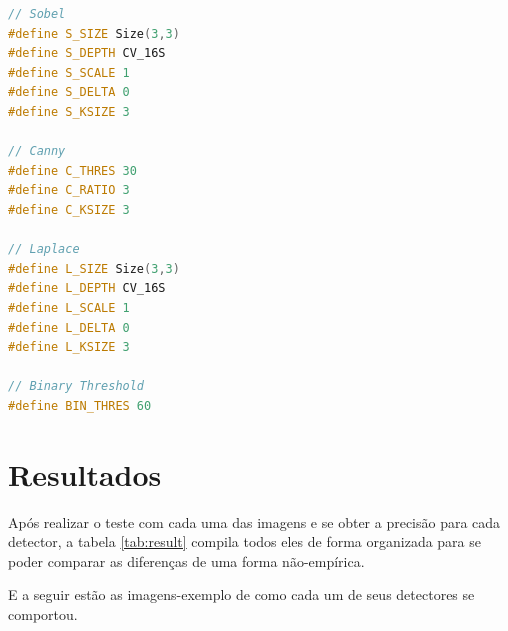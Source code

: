 \documentclass[10pt,twocolumn,letterpaper]{article}
\begin{document}
\begin{lstlisting}[language=C++, caption={Parâmetros passados para os detectores}, label={code:defs}]
// Sobel
#define S_SIZE Size(3,3)
#define S_DEPTH CV_16S
#define S_SCALE 1
#define S_DELTA 0
#define S_KSIZE 3

// Canny
#define C_THRES 30
#define C_RATIO 3
#define C_KSIZE 3

// Laplace
#define L_SIZE Size(3,3)
#define L_DEPTH CV_16S
#define L_SCALE 1
#define L_DELTA 0
#define L_KSIZE 3

// Binary Threshold
#define BIN_THRES 60
\end{lstlisting}

\section{Resultados}
Após realizar o teste com cada uma das imagens e se obter a precisão para cada detector, a tabela \ref{tab:result} compila todos eles de forma organizada para se poder comparar as diferenças de uma forma não-empírica.

\begin{table}[!htp]
\centering
{}
\caption{Precisão obtida com cada detector por imagem}
\label{tab:result}
\end{table}

E a seguir estão as imagens-exemplo de como cada um de seus detectores se comportou.
\end{document}
